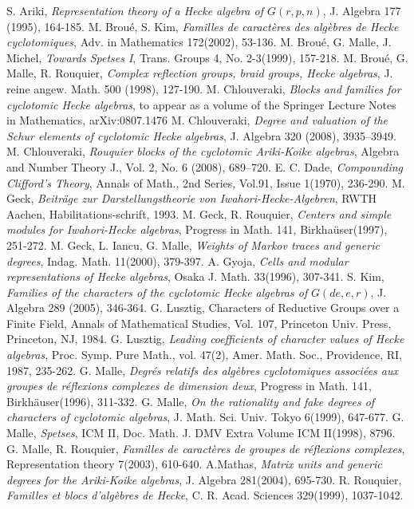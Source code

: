 \documentclass[10pt,a4paper,titlepage]{article}
\begin{document}
\begin{thebibliography}{00}
 S. Ariki, \emph{Representation theory of a Hecke algebra of $G(r,p,n)$}, J. Algebra 177 (1995), 164-185.
  M. Brou{\'e}, S. Kim, \emph{Familles de caract{\`e}res des alg{\`e}bres de Hecke
cyclotomiques}, Adv. in Mathematics 172(2002), 53-136.
  M. Brou{\'e}, G. Malle, J. Michel, \emph{Towards Spetses I}, Trans. Groups 4, No. 2-3(1999), 157-218.
 M. Brou{\'e}, G. Malle, R. Rouquier, \emph{Complex
reflection groups, braid groups, Hecke algebras}, J. reine angew.
Math. 500 (1998), 127-190.
 M. Chlouveraki, \emph{Blocks and families for cyclotomic Hecke algebras},
to appear as a volume of the Springer Lecture Notes in Mathematics, arXiv:0807.1476
 M. Chlouveraki, \emph{Degree and valuation of the Schur elements of cyclotomic Hecke algebras}, J. Algebra 320 (2008), 3935--3949.
 M. Chlouveraki, \emph{Rouquier blocks of the cyclotomic Ariki-Koike algebras}, Algebra and Number Theory J., Vol. 2, No. 6 (2008), 689--720.
 E. C. Dade, \emph{Compounding Clifford's Theory}, Annals
of Math., 2nd Series, Vol.91, Issue 1(1970), 236-290.
 M. Geck, \emph{Beitr{\"a}ge zur Darstellungstheorie von Iwahori-Hecke-Algebren}, RWTH Aachen, Habilitations-schrift, 1993.
 M. Geck, R. Rouquier, \emph{Centers and simple modules for Iwahori-Hecke algebras}, Progress in Math. 141, Birkha{\"u}ser(1997), 251-272.
  M. Geck, L. Iancu, G. Malle, \emph{Weights of Markov traces and generic degrees}, Indag. Math. 11(2000), 379-397.
 A. Gyoja, \emph{Cells and modular representations of
Hecke algebras}, Osaka J. Math. 33(1996), 307-341.
 S. Kim, \emph{Families of the characters of the cyclotomic Hecke algebras of}
$G(de,e,r)$, J. Algebra 289 (2005), 346-364.
 G. Lusztig, Characters of Reductive Groups
over a Finite Field, Annals of Mathematical Studies, Vol. 107,
Princeton Univ. Press, Princeton, NJ, 1984.
 G. Lusztig,  \emph{Leading coefficients of character values of Hecke algebras}, Proc. Symp. Pure Math., vol. 47(2), Amer. Math. Soc., Providence, RI, 1987, 235-262.
  G. Malle, \emph{Degr{\'e}s relatifs des alg{\`e}bres cyclotomiques associ{\'e}es aux
groupes de r{\'e}flexions complexes de dimension deux}, Progress in
Math. 141, Birkh{\"a}user(1996), 311-332.
  G. Malle, \emph{On the rationality and fake degrees of characters of cyclotomic algebras}, J. Math. Sci. Univ.
Tokyo 6(1999), 647-677.
 G. Malle, \emph{Spetses}, ICM II, Doc. Math. J. DMV Extra Volume ICM II(1998), 8796.
 G. Malle, R. Rouquier, \emph{Familles de caract{\`e}res de groupes de r{\'e}flexions complexes}, Representation theory 7(2003), 610-640.
  A.Mathas,  \emph{Matrix units and generic degrees for the Ariki-Koike algebras}, J. Algebra 281(2004), 695-730.
  R. Rouquier, \emph{Familles et blocs d'alg{\`e}bres de Hecke}, C. R. Acad. Sciences 329(1999), 1037-1042.



\end{thebibliography}
\end{document}
